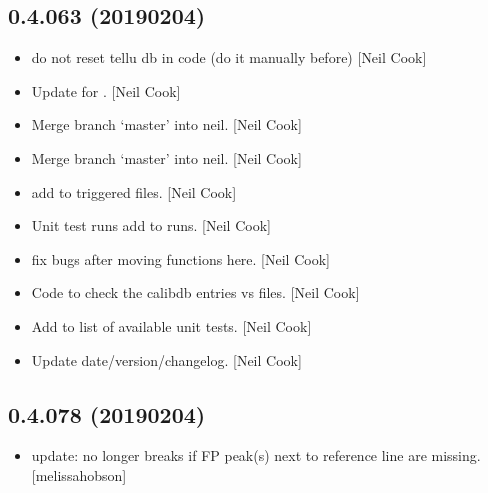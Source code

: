 \documentclass[a4paper,10pt,english]{report}
\begin{document}
\subsection{0.4.063 (2019\sphinxhyphen{}02\sphinxhyphen{}04)}
\label{\detokenize{misc/changelog:id214}}\begin{itemize}
\item {} 
 \sphinxhyphen{} do not reset tellu db in code (do it manually
before) {[}Neil Cook{]}

\item {} 
Update  for . {[}Neil Cook{]}

\item {} 
Merge branch ‘master’ into neil. {[}Neil Cook{]}

\item {} 
Merge branch ‘master’ into neil. {[}Neil Cook{]}

\item {} 
 \sphinxhyphen{} add  to triggered files. {[}Neil
Cook{]}

\item {} 
Unit test runs \sphinxhyphen{} add  to runs. {[}Neil Cook{]}

\item {} 
 \sphinxhyphen{} fix bugs after moving functions here. {[}Neil Cook{]}

\item {} 
Code to check the calibdb entries vs files. {[}Neil Cook{]}

\item {} 
Add  to list of available unit tests. {[}Neil Cook{]}

\item {} 
Update date/version/changelog. {[}Neil Cook{]}

\end{itemize}


\subsection{0.4.078 (2019\sphinxhyphen{}02\sphinxhyphen{}04)}
\label{\detokenize{misc/changelog:id215}}\begin{itemize}
\item {} 
 update: no longer breaks if FP peak(s) next to reference
line are missing. {[}melissa\sphinxhyphen{}hobson{]}

\end{itemize}
\end{document}
